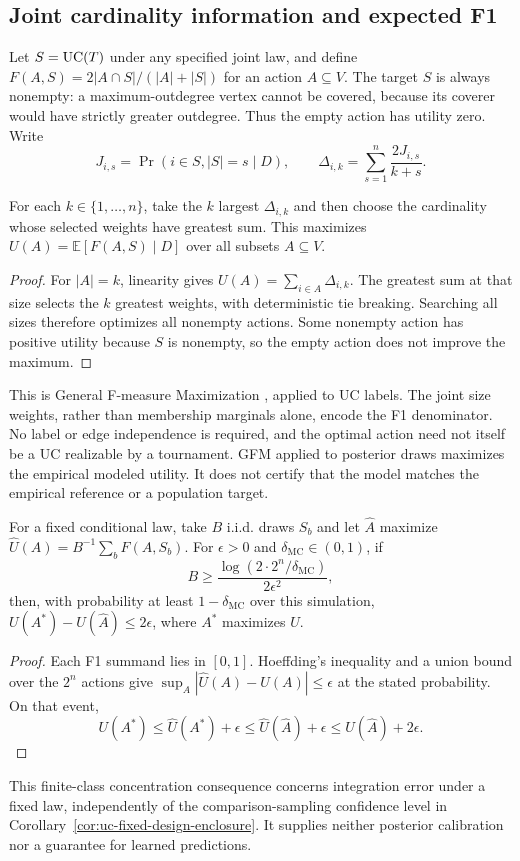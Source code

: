 \subsection{Joint cardinality information and expected F1}\label{app:posterior-gfm}
Let $S=\mathrm{UC}(T)$ under any specified joint law, and define $F(A,S)=2|A\cap S|/(|A|+|S|)$ for an action $A\subseteq V$. The target $S$ is always nonempty: a maximum-outdegree vertex cannot be covered, because its coverer would have strictly greater outdegree. Thus the empty action has utility zero. Write
\[
J_{i,s}=\Pr(i\in S,|S|=s\mid D),\qquad
\Delta_{i,k}=\sum_{s=1}^n\frac{2J_{i,s}}{k+s}.
\]
\begin{proposition}\label{prop:uc-gfm}
For each $k\in\{1,\ldots,n\}$, take the $k$ largest $\Delta_{i,k}$ and then choose the cardinality whose selected weights have greatest sum. This maximizes $U(A)=\mathbb E[F(A,S)\mid D]$ over all subsets $A\subseteq V$.
\end{proposition}
\begin{proof}
For $|A|=k$, linearity gives $U(A)=\sum_{i\in A}\Delta_{i,k}$. The greatest sum at that size selects the $k$ greatest weights, with deterministic tie breaking. Searching all sizes therefore optimizes all nonempty actions. Some nonempty action has positive utility because $S$ is nonempty, so the empty action does not improve the maximum.
\end{proof}
This is General F-measure Maximization \citep{waegeman2014fmeasure}, applied to UC labels. The joint size weights, rather than membership marginals alone, encode the F1 denominator. No label or edge independence is required, and the optimal action need not itself be a UC realizable by a tournament. GFM applied to posterior draws maximizes the empirical modeled utility. It does not certify that the model matches the empirical reference or a population target.

\begin{corollary}\label{cor:posterior-gfm-mc}
For a fixed conditional law, take $B$ i.i.d. draws $S_b$ and let $\widehat A$ maximize $\widehat U(A)=B^{-1}\sum_bF(A,S_b)$. For $\epsilon>0$ and $\delta_{\mathrm{MC}}\in(0,1)$, if
\[
B\ge\frac{\log(2\cdot2^n/\delta_{\mathrm{MC}})}{2\epsilon^2},
\]
then, with probability at least $1-\delta_{\mathrm{MC}}$ over this simulation, $U(A^*)-U(\widehat A)\le2\epsilon$, where $A^*$ maximizes $U$.
\end{corollary}
\begin{proof}
Each F1 summand lies in $[0,1]$. Hoeffding's inequality and a union bound over the $2^n$ actions give $\sup_A|\widehat U(A)-U(A)|\le\epsilon$ at the stated probability. On that event,
\[
U(A^*)\le\widehat U(A^*)+\epsilon\le\widehat U(\widehat A)+\epsilon\le U(\widehat A)+2\epsilon.
\]
\end{proof}
This finite-class concentration consequence concerns integration error under a fixed law, independently of the comparison-sampling confidence level in Corollary~\ref{cor:uc-fixed-design-enclosure}. It supplies neither posterior calibration nor a guarantee for learned predictions.

